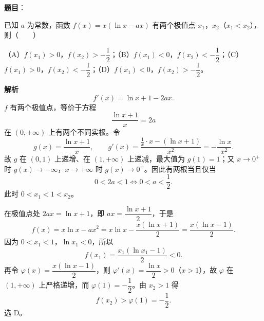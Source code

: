 \begin{answer}

\textbf{题目}：

已知 $a$ 为常数，函数 $f(x)=x(\ln x-ax)$ 有两个极值点 $x_1$，$x_2$（$x_1<x_2$），则\mbox{（　　）}

（A）$f(x_1)>0$，$f(x_2)>-\dfrac12$；（B）$f(x_1)<0$，$f(x_2)<-\dfrac12$；（C）$f(x_1)>0$，$f(x_2)<-\dfrac12$；（D）$f(x_1)<0$，$f(x_2)>-\dfrac12$。

\textbf{解析}
\nopagebreak[4]
\[f'(x)=\ln x+1-2ax.\]
$f$ 有两个极值点，等价于方程
\nopagebreak[4]
\[\frac{\ln x+1}{x}=2a\]
在 $(0,+\infty)$ 上有两个不同实根。令
\nopagebreak[4]
\[g(x)=\frac{\ln x+1}{x},\qquad
g'(x)=\frac{\frac1x\cdot x-(\ln x+1)}{x^2}=-\frac{\ln x}{x^2}.\]
故 $g$ 在 $(0,1)$ 上递增、在 $(1,+\infty)$ 上递减，最大值为 $g(1)=1$；又 $x\to0^+$ 时 $g(x)\to-\infty$，$x\to+\infty$ 时 $g(x)\to0^+$。因此有两根当且仅当
\nopagebreak[4]
\[0<2a<1\iff0<a<\frac12.\]
此时 $0<x_1<1<x_2$。

在极值点处 $2ax=\ln x+1$，即 $ax=\dfrac{\ln x+1}{2}$，于是
\nopagebreak[4]
\[f(x)=x\ln x-ax^2
=x\ln x-\frac{x(\ln x+1)}{2}
=\frac{x(\ln x-1)}{2}.\]
因为 $0<x_1<1$，$\ln x_1<0$，所以
\nopagebreak[4]
\[f(x_1)=\frac{x_1(\ln x_1-1)}{2}<0.\]
再令 $\varphi(x)=\dfrac{x(\ln x-1)}{2}$，则 $\varphi'(x)=\dfrac{\ln x}{2}>0$（$x>1$），故 $\varphi$ 在 $(1,+\infty)$ 上严格递增，而 $\varphi(1)=-\dfrac12$。由 $x_2>1$ 得
\nopagebreak[4]
\[f(x_2)>\varphi(1)=-\frac12.\]
选 D。


\end{answer}

